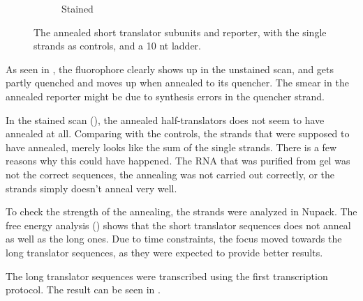 \begin{figure}[h]
\begin{subfigure}[t]{.5\textwidth}
  \caption{Stained}
  \label{transcription_annealed_stain}
\end{subfigure}
\caption{The annealed short translator subunits and reporter, with the single strands as controls, and a 10 nt ladder.}
\label{transcription_annealed}
\end{figure}

As seen in , the fluorophore clearly shows up in the unstained scan, and gets partly quenched and moves up when annealed to its quencher. The smear in the annealed reporter might be due to synthesis errors in the quencher strand.

In the stained scan (), the annealed half-translators does not seem to have annealed at all. Comparing with the controls, the strands that were supposed to have annealed, merely looks like the sum of the single strands. There is a few reasons why this could have happened. The RNA that was purified from gel was not the correct sequences, the annealing was not carried out correctly, or the strands simply doesn't anneal very well.

To check the strength of the annealing, the strands were analyzed in Nupack. The free energy analysis () shows that the short translator sequences does not anneal as well as the long ones. Due to time constraints, the focus moved towards the long translator sequences, as they were expected to provide better results.

The long translator sequences were transcribed using the first transcription protocol. The result can be seen in .

